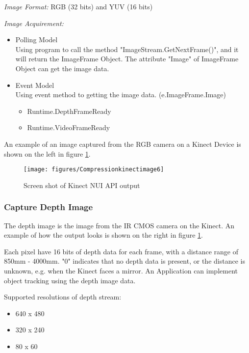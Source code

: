 \textit{Image Format:}
RGB (32 bits) and YUV (16 bits)

\textit{Image Acquirement:}
\begin{itemize}
\item Polling Model \\
Using program to call the method "ImageStream.GetNextFrame()", and it will return the ImageFrame Object. The attribute "Image" of ImageFrame Object can get the image data.

\item Event Model \\
Using event method to getting the image data. (e.ImageFrame.Image)
  \begin{itemize}
  \item Runtime.DepthFrameReady
  \item Runtime.VideoFrameReady
  \end{itemize}
\end{itemize}


An example of an image captured from the RGB camera on a Kinect Device is shown on the left in figure \ref{fig:kinectcaptureimage}.

\begin{figure}[hbt]
  \center
        \texttt{[image: figures/Compressionkinectimage6]}
        \caption{Screen shot of Kinect NUI API output}
  \label{fig:kinectcaptureimage}
\end{figure}

\subsubsection{Capture Depth Image}
The depth image is the image from the IR CMOS camera on the Kinect. An example of how the output looks is shown on the right in figure \ref{fig:kinectcaptureimage}.

Each pixel have 16 bits of depth data for each frame, with a distance range of 850mm - 4000mm. "0" indicates that no depth data is present, or the distance is unknown, e.g. when the Kinect faces a mirror. An Application can implement object tracking using the depth image data.

Supported resolutions of depth stream:
\begin{itemize}
\item 640 x 480
\item 320 x 240
\item 80 x 60
\end{itemize}

